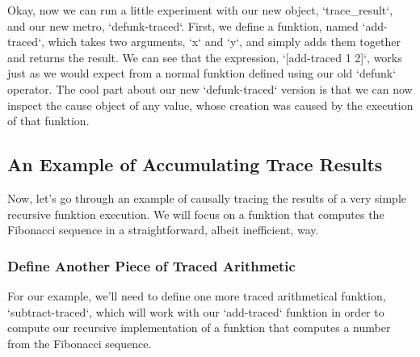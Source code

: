 Okay, now we can run a little experiment with our new object,
`trace\_result`, and our new metro, `defunk-traced`.  First, we define
a funktion, named `add-traced`, which takes two arguments, `x` and
`y`, and simply adds them together and returns the result.  We can see
that the expression, `[add-traced 1 2]`, works just as we would expect
from a normal funktion defined using our old `defunk` operator.  The
cool part about our new `defunk-traced` version is that we can now
inspect the cause object of any value, whose creation was caused by
the execution of that funktion.

%
%
%
%
%
%
%
%
%
%

\subsection{An Example of Accumulating Trace Results}

Now, let's go through an example of causally tracing the results of a
very simple recursive funktion execution.  We will focus on a funktion
that computes the Fibonacci sequence in a straightforward, albeit
inefficient, way.

\subsubsection{Define Another Piece of Traced Arithmetic}

For our example, we'll need to define one more traced arithmetical
funktion, `subtract-traced`, which will work with our `add-traced`
funktion in order to compute our recursive implementation of a
funktion that computes a number from the Fibonacci sequence.

%

